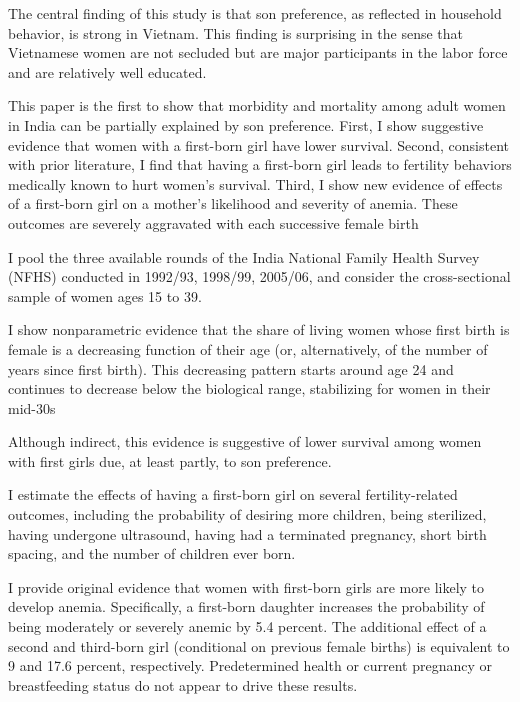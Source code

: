 The central finding of this study is that son preference,
as reflected in household behavior, is strong in Vietnam.
This finding is surprising in the sense that Vietnamese
women are not secluded but are major participants in
the labor force and are relatively well educated.

\citep{Milazzo2018}

This paper is the ﬁrst to show that morbidity and mortality among adult
women in India can be partially explained by son preference. First, I
show suggestive evidence that women with a ﬁrst-born girl have lower
survival. Second, consistent with prior literature, I ﬁnd that having a
ﬁrst-born girl leads to fertility behaviors medically known to hurt
women’s survival. Third, I show new evidence of eﬀects of a ﬁrst-born
girl on a mother’s likelihood and severity of anemia. These outcomes are
severely aggravated with each successive female birth

I pool the three available rounds of the India National Family Health
Survey (NFHS) conducted in 1992/93, 1998/99, 2005/06, and consider the
cross-sectional sample of women ages 15 to 39.

I show nonparametric evidence that the share of living women whose ﬁrst
birth is female is a decreasing function of their age (or,
alternatively, of the number of years since ﬁrst birth). This decreasing
pattern starts around age 24 and continues to decrease below the
biological range, stabilizing for women in their mid-30s

Although indirect, this evidence is suggestive of lower survival among
women with ﬁrst girls due, at least partly, to son preference.

I estimate the eﬀects of having a ﬁrst-born girl on several
fertility-related outcomes, including the probability of desiring more
children, being sterilized, having undergone ultrasound, having had a
terminated pregnancy, short birth spacing, and the number of children
ever born.

I provide original evidence that women with ﬁrst-born girls are more
likely to develop anemia. Speciﬁcally, a ﬁrst-born daughter increases
the probability of being moderately or severely anemic by 5.4 percent.
The additional eﬀect of a second and third-born girl (conditional on
previous female births) is equivalent to 9 and 17.6 percent,
respectively. Predetermined health or current pregnancy or breastfeeding
status do not appear to drive these results.

\citep{Gangadharan2003}

